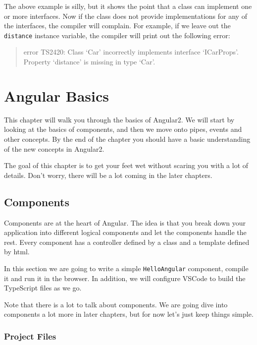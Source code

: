 \documentclass[12pt,]{article}
\begin{document}
The above example is silly, but it shows the point that a class can
implement one or more interfaces. Now if the class does not provide
implementations for any of the interfaces, the compiler will complain.
For example, if we leave out the \texttt{distance} instance variable,
the compiler will print out the following error:

\begin{quote}
error TS2420: Class `Car' incorrectly implements interface `ICarProps'.
Property `distance' is missing in type `Car'.
\end{quote}

\section{Angular Basics}\label{angular-basics}

This chapter will walk you through the basics of Angular2. We will start
by looking at the basics of components, and then we move onto pipes,
events and other concepts. By the end of the chapter you should have a
basic understanding of the new concepts in Angular2.

The goal of this chapter is to get your feet wet without scaring you
with a lot of details. Don't worry, there will be a lot coming in the
later chapters.

\subsection{Components}\label{components}

Components are at the heart of Angular. The idea is that you break down
your application into different logical components and let the
components handle the rest. Every component has a controller defined by
a class and a template defined by html.

In this section we are going to write a simple \texttt{HelloAngular}
component, compile it and run it in the browser. In addition, we will
configure VSCode to build the TypeScript files as we go.

Note that there is a lot to talk about components. We are going dive
into components a lot more in later chapters, but for now let's just
keep things simple.

\subsubsection{Project Files}\label{project-files}
\end{document}
